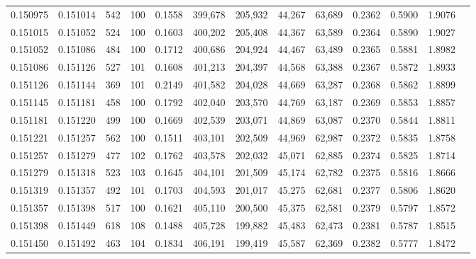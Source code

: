 \begin{tabular}{rrrrrrrrrrrrr}
0.150975 & 0.151014 &   542 & 100 &                                     0.1558 & 399,678 & 205,932 &  44,267 &  63,689 & 0.2362 & 0.5900 & 1.9076 \\
0.151015 & 0.151052 &   524 & 100 &                                     0.1603 & 400,202 & 205,408 &  44,367 &  63,589 & 0.2364 & 0.5890 & 1.9027 \\
0.151052 & 0.151086 &   484 & 100 &                                     0.1712 & 400,686 & 204,924 &  44,467 &  63,489 & 0.2365 & 0.5881 & 1.8982 \\
0.151086 & 0.151126 &   527 & 101 &                                     0.1608 & 401,213 & 204,397 &  44,568 &  63,388 & 0.2367 & 0.5872 & 1.8933 \\
0.151126 & 0.151144 &   369 & 101 &                                     0.2149 & 401,582 & 204,028 &  44,669 &  63,287 & 0.2368 & 0.5862 & 1.8899 \\
0.151145 & 0.151181 &   458 & 100 &                                     0.1792 & 402,040 & 203,570 &  44,769 &  63,187 & 0.2369 & 0.5853 & 1.8857 \\
0.151181 & 0.151220 &   499 & 100 &                                     0.1669 & 402,539 & 203,071 &  44,869 &  63,087 & 0.2370 & 0.5844 & 1.8811 \\
0.151221 & 0.151257 &   562 & 100 &                                     0.1511 & 403,101 & 202,509 &  44,969 &  62,987 & 0.2372 & 0.5835 & 1.8758 \\
0.151257 & 0.151279 &   477 & 102 &                                     0.1762 & 403,578 & 202,032 &  45,071 &  62,885 & 0.2374 & 0.5825 & 1.8714 \\
0.151279 & 0.151318 &   523 & 103 &                                     0.1645 & 404,101 & 201,509 &  45,174 &  62,782 & 0.2375 & 0.5816 & 1.8666 \\
0.151319 & 0.151357 &   492 & 101 &                                     0.1703 & 404,593 & 201,017 &  45,275 &  62,681 & 0.2377 & 0.5806 & 1.8620 \\
0.151357 & 0.151398 &   517 & 100 &                                     0.1621 & 405,110 & 200,500 &  45,375 &  62,581 & 0.2379 & 0.5797 & 1.8572 \\
0.151398 & 0.151449 &   618 & 108 &                                     0.1488 & 405,728 & 199,882 &  45,483 &  62,473 & 0.2381 & 0.5787 & 1.8515 \\
0.151450 & 0.151492 &   463 & 104 &                                     0.1834 & 406,191 & 199,419 &  45,587 &  62,369 & 0.2382 & 0.5777 & 1.8472 \\

\end{tabular}
